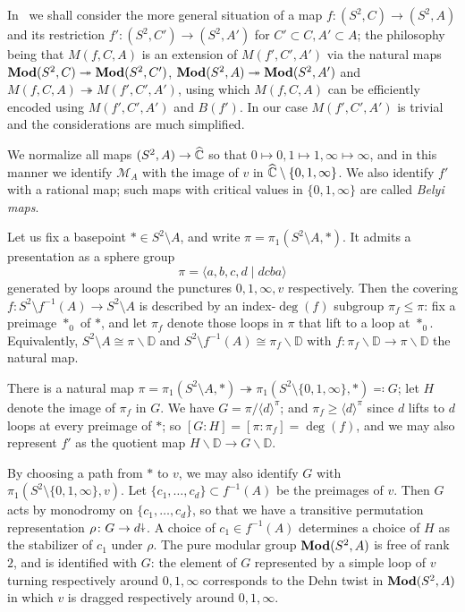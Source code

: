 \documentclass{amsart}
\begin{document}
In~\cite{bartholdi-dudko:bc3} we shall consider the more general
situation of a map $f\colon(S^2,C)\to(S^2,A)$ and its restriction
$f'\colon(S^2,C')\to(S^2,A')$ for $C'\subset C, A'\subset A$; the
philosophy being that $M(f,C,A)$ is an extension of $M(f',C',A')$ via
the natural maps $\mathbf{\relax Mod}(S^2,C)\twoheadrightarrow\mathbf{\relax Mod}(S^2,C')$,
$\mathbf{\relax Mod}(S^2,A)\twoheadrightarrow\mathbf{\relax Mod}(S^2,A')$ and
$M(f,C,A)\twoheadrightarrow M(f',C',A')$, using which $M(f,C,A)$ can
be efficiently encoded using $M(f',C',A')$ and $B(f')$. In our case
$M(f',C',A')$ is trivial and the considerations are much simplified.

We normalize all maps $(S^2,A)\to{\widehat{{\mathbb C}}}$ so that
$0\mapsto0,1\mapsto1,\infty\mapsto\infty$, and in this manner we
identify $\mathscr M_A$ with the image of $v$ in
${\widehat{{\mathbb C}}}\setminus\{0,1,\infty\}$. We also identify $f'$ with a
rational map; such maps with critical values in $\{0,1,\infty\}$ are
called \emph{Belyi maps}.

Let us fix a basepoint $*\in S^2\setminus A$, and write
$\pi=\pi_1(S^2\setminus A,*)$. It admits a presentation as a sphere group
\[\pi=\langle a,b,c,d\mid d c b a\rangle\]
generated by loops around the punctures $0,1,\infty,v$
respectively. Then the covering
$f\colon S^2\setminus f^{-1}(A)\to S^2\setminus A$ is described by an
index-$\deg(f)$ subgroup $\pi_f\le\pi$: fix a preimage $*_0$ of $*$,
and let $\pi_f$ denote those loops in $\pi$ that lift to a loop at
$*_0$. Equivalently, $S^2\setminus A\cong\pi\backslash\mathbb D$ and
$S^2\setminus f^{-1}(A)\cong\pi_f\backslash\mathbb D$ with
$f\colon\pi_f\backslash\mathbb D\to\pi\backslash\mathbb D$ the natural
map.

There is a natural map
$\pi=\pi_1(S^2\setminus
A,*)\twoheadrightarrow\pi_1(S^2\setminus\{0,1,\infty\},*)\eqqcolon G$;
let $H$ denote the image of $\pi_f$ in $G$. We have
$G=\pi/\langle d\rangle^\pi$; and $\pi_f\ge\langle d\rangle^\pi$ since
$d$ lifts to $d$ loops at every preimage of $*$; so
$[G:H]=[\pi:\pi_f]=\deg(f)$, and we may also represent $f'$ as the
quotient map $H\backslash\mathbb D\to G\backslash\mathbb D$.

By choosing a path from $*$ to $v$, we may also identify $G$ with
$\pi_1(S^2\setminus\{0,1,\infty\},v)$. Let $\{c_1,\dots,c_d\}\subset
f^{-1}(A)$ be the preimages of $v$. Then $G$ acts by monodromy on
$\{c_1,\dots,c_d\}$, so that we have a transitive permutation
representation $\rho\colon G\to d{\stackrel{\downarrow}{\smash.}}$. A choice of $c_1\in
f^{-1}(A)$ determines a choice of $H$ as the stabilizer of $c_1$ under
$\rho$.  The pure modular group $\mathbf{\relax Mod}(S^2,A)$ is free of rank $2$, and
is identified with $G$: the element of $G$ represented by a simple
loop of $v$ turning respectively around $0,1,\infty$ corresponds to
the Dehn twist in $\mathbf{\relax Mod}(S^2,A)$ in which $v$ is dragged respectively
around $0,1,\infty$.
\end{document}
